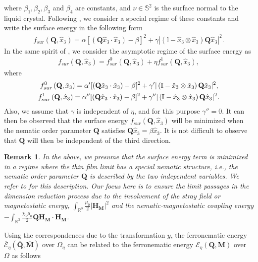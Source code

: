 \documentclass{article}
\newtheorem{remark}[theorem]{Remark}
\def\Qvec{\mathbf{Q}}
\def \Mvec{\mathbf{M}}
\def\Hvec{\mathbf{H}}
\begin{document}
where $\beta_1, \beta_2, \beta_3$ and $\beta_4$ are constants, and $\nu\in\mathbb S^2$ is the surface normal to the liquid crystal. Following \cite{golovaty2015dimension}, we consider a special regime of these constants and write the surface energy in the following form
\begin{eqnarray}
f_{sur}\left(\Qvec, \hat{x}_3\right)=\alpha[\left(\Qvec\hat{x}_3\cdot\hat{x}_3\right)-\beta]^2+\gamma|\left(\mathbb I - \hat{x}_3\otimes\hat{x}_3\right)\Qvec\hat{x}_3|^2.
\end{eqnarray}
In the same spirit of \cite{golovaty2015dimension}, we consider the asymptotic regime of the surface energy as
\begin{eqnarray}
f_{sur}\left(\Qvec, \hat{x}_3\right)=f^0_{sur}\left(\Qvec, \hat{x}_3\right)+\eta f^1_{sur}\left(\Qvec, \hat{x}_3\right),
\end{eqnarray}
where
\begin{eqnarray}
f^0_{sur}\left(\Qvec, \hat{x}_3\right)=\alpha'[\left(\Qvec\hat{x}_3\cdot\hat{x}_3\right)-\beta]^2+\gamma'|\left(\mathbb I - \hat{x}_3\otimes\hat{x}_3\right)\Qvec\hat{x}_3|^2,\newline\\
f^1_{sur}\left(\Qvec, \hat{x}_3\right)=\alpha''[\left(\Qvec\hat{x}_3\cdot\hat{x}_3\right)-\beta]^2+\gamma''|\left(\mathbb I - \hat{x}_3\otimes\hat{x}_3\right)\Qvec\hat{x}_3|^2.
\end{eqnarray}
Also, we assume that $\gamma$ is independent of $\eta$, and for this purpose $\gamma''=0$. It can then be observed that the surface energy $f_{sur}\left(\Qvec, \hat{x}_3\right)$ will be minimized when the nematic order parameter $\Qvec$ satisfies $\Qvec\hat{x}_3=\beta\hat{x}_3$. It is not difficult to observe that $\Qvec$ will then be independent of the third direction.
\begin{remark}
In the above, we presume that the surface energy term is minimized in a regime where the thin film limit has a special nematic structure, i.e., the nematic order parameter $\Qvec$ is described by the two independent variables. We refer to \cite{golovaty2014minimizers} for this description. Our focus here is to ensure the limit passages in the dimension reduction process due to the involvement of the stray field or magnetostatic energy, $\int_{\mathbb R^3}\frac{\mu_0}{2}|\Hvec_{\Mvec}|^2$ and the nematic-magnetostatic coupling energy $-\int_{\mathbb R^3}\frac{\chi_1\mu_0}{2}\Qvec\Hvec_{\Mvec}\cdot\Hvec_{\Mvec}$.
\end{remark}
Using the correspondences due to the transformation $y$, the ferronematic energy $\mathcal{\overline{E}}_{\eta}\left(\overline{\Qvec}, \overline{\Mvec}\right)$ over $\Omega_{\eta}$ can be related to the ferronematic energy $\mathcal{E}_{\eta}\left(\Qvec, \Mvec\right)$ over $\Omega$ as follows
\end{document}
